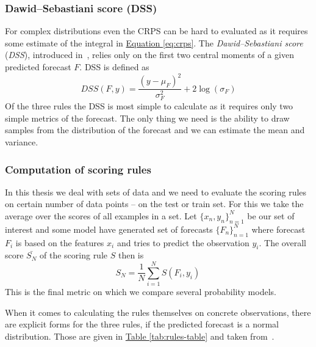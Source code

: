 \documentclass[12pt,a4paper,twoside]{scrartcl}
\numberwithin{equation}{section}
\newcommand{\reftab}[1]{\hyperref[#1]{Table \ref*{#1}}}
\renewcommand*{\refeq}[1]{\hyperref[#1]{Equation \ref*{#1}}}
\begin{document}
\subsubsection{Dawid–Sebastiani score (DSS)}\label{sec:dss}
For complex distributions even the CRPS can be hard to evaluated as it requires some estimate of the integral in \refeq{eq:crps}. The \emph{Dawid–Sebastiani score} (\emph{DSS}), introduced in~\cite{dawid1999}, relies only on the first two central moments of a given predicted forecast \(F\). DSS is defined as
\begin{equation}
  DSS(F,y) =  \frac{(y-\mu_F)^2}{\sigma_F^2}+2\log(\sigma_F)
\end{equation}
Of the three rules the DSS is most simple to calculate as it requires only two simple metrics of the forecast. The only thing we need is the ability to draw samples from the distribution of the forecast and we can estimate the mean and variance.
\subsubsection{Computation of scoring rules}\label{sec:eval-rules}
In this thesis we deal with sets of data and we need to evaluate the scoring rules on certain number of data points -- on the test or train set. For this we take the average over the scores of all examples in a set. Let \(\{x_n, y_n\}_{n=1}^N\) be our set of interest and some model have generated set of forecasts \(\{F_n\}_{n=1}^N\) where forecast \(F_i\) is based on the features \(x_i\) and tries to predict the observation \(y_i\). The overall score \(\bar{S_N}\) of the scoring rule \(S\) then is
\begin{equation}
  S_N = \frac{1}{N}\sum_{i=1}^N S(F_i, y_i) \,
\end{equation}
This is the final metric on which we compare several probability models.

When it comes to calculating the rules themselves on concrete observations, there are explicit forms for the three rules, if the predicted forecast is a normal distribution. Those are given in \reftab{tab:rules-table} and taken from~\cite{gneiting2014}.
\end{document}
